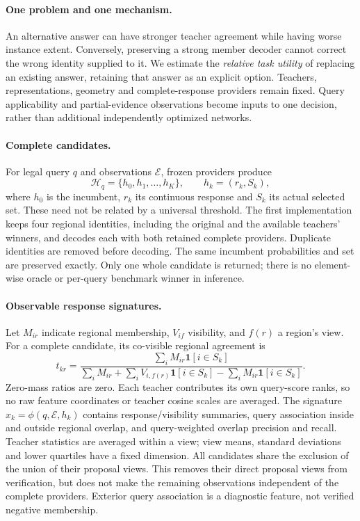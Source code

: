 \paragraph{One problem and one mechanism.}
An alternative answer can have stronger teacher agreement while having worse
instance extent. Conversely, preserving a strong member decoder cannot correct
the wrong identity supplied to it. We estimate the \emph{relative task utility}
of replacing an existing answer, retaining that answer as an explicit option.
Teachers, representations, geometry and complete-response providers remain
fixed. Query applicability and partial-evidence observations become inputs to
one decision, rather than additional independently optimized networks.

\paragraph{Complete candidates.}
For legal query $q$ and observations $\mathcal E$, frozen providers produce
\[
 \mathcal H_q=\{h_0,h_1,\ldots,h_K\},\qquad h_k=(r_k,S_k),
\]
where $h_0$ is the incumbent, $r_k$ its continuous response and $S_k$ its actual
selected set. These need not be related by a universal threshold. The first
implementation keeps four regional identities, including the original and
the available teachers' winners, and decodes each with both retained complete
providers. Duplicate identities are removed before decoding. The same incumbent
probabilities and set are preserved exactly. Only one whole candidate is returned;
there is no element-wise oracle or per-query benchmark winner in inference.

\paragraph{Observable response signatures.}
Let $M_{ir}$ indicate regional membership, $V_{if}$ visibility, and $f(r)$ a
region's view. For a complete candidate, its co-visible regional agreement is
\[
 t_{kr}=\frac{\sum_i M_{ir}\mathbf1[i\in S_k]}
 {\sum_i M_{ir}+\sum_i V_{i,f(r)}\mathbf1[i\in S_k]
                   -\sum_i M_{ir}\mathbf1[i\in S_k]}.
\]
Zero-mass ratios are zero. Each teacher contributes its own query-score ranks,
so no raw feature coordinates or teacher cosine scales are averaged.
The signature $x_k=\phi(q,\mathcal E,h_k)$ contains response/visibility summaries,
query association inside and outside regional overlap, and query-weighted
overlap precision and recall. Teacher statistics are averaged within a view;
view means, standard deviations and lower quartiles have a fixed dimension.
All candidates share the exclusion of the union of their proposal views.
This removes their direct proposal views from verification, but does not make
the remaining observations independent of the complete providers. Exterior
query association is a diagnostic feature, not verified negative membership.

